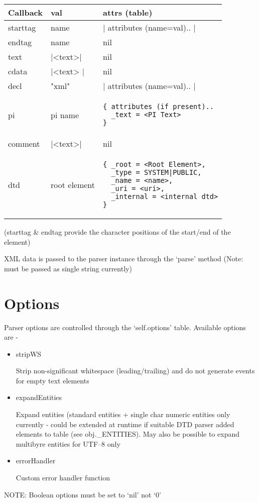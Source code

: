 \documentclass{ltxdoc}
\begin{document}
\begin{tabular}{llp{5cm}}
Callback   &  val        &    attrs (table)\\
\hline
starttag     &   name &   |{ attributes (name=val).. }|\\
endtag       &   name   &    nil\\
text      &   |<text>| &   nil\\
cdata     &   |<text> |  &   nil\\
decl      &   "xml"       &   |{ attributes (name=val).. }|\\
pi        &   pi name     &  \begin{verbatim}{ attributes (if present)..
  _text = <PI Text>
}\end{verbatim}\\
comment   &   |<text>|      &   nil\\     
dtd       &   root element  & \begin{verbatim}{ _root = <Root Element>,
  _type = SYSTEM|PUBLIC,
  _name = <name>,
  _uri = <uri>,
  _internal = <internal dtd>
}\end{verbatim}\\
\end{tabular}

(starttag \& endtag provide the character positions of the start/end of the
element)

XML data is passed to the parser instance through the `parse' method
(Note: must be passed as single string currently)

\section{Options}

Parser options are controlled through the `self.options' table.
Available options are -

\begin{itemize}
\item
  stripWS

  Strip non-significant whitespace (leading/trailing) and do not
  generate events for empty text elements
\item
  expandEntities

  Expand entities (standard entities + single char numeric entities only
  currently - could be extended at runtime if suitable DTD parser added
  elements to table (see obj.\_ENTITIES). May also be possible to expand
  multibyre entities for UTF--8 only
\item
  errorHandler

  Custom error handler function
\end{itemize}
NOTE: Boolean options must be set to `nil' not `0'
\end{document}
